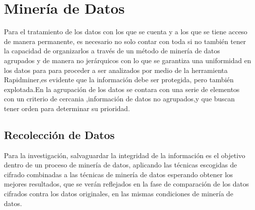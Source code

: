 \documentclass[a4paper,openright,12pt]{book}
\theoremstyle{definition}
\theoremstyle{remark}
\begin{document}
\section{Minería de Datos}

Para el tratamiento de los datos con los que se cuenta y a los que se tiene acceso de manera permanente, es necesario no solo contar con toda si no también tener la capacidad de organizarlos a través de un método de minería de datos agrupados y de manera no jerárquicos con lo que se garantiza una uniformidad en los datos para para proceder a ser analizados por medio de la herramienta Rapidminer,es evidente que la información debe ser protegida, pero también explotada.En la agrupación de los datos se contara con una serie de elementos  con un criterio de cercania ,información de datos no agrupados,y que buscan tener orden  para determinar su prioridad. 


	\subsection{Recolección de Datos}
    Para la investigación, salvaguardar la integridad de la información es el objetivo dentro de un proceso de minería de datos, aplicando las técnicas escogidas de cifrado combinadas a las técnicas de minería de datos esperando obtener los mejores resultados, que se verán reflejados en la fase de comparación de los datos cifrados contra los datos originales, en las mismas condiciones de minería de datos.
    
\end{document}
